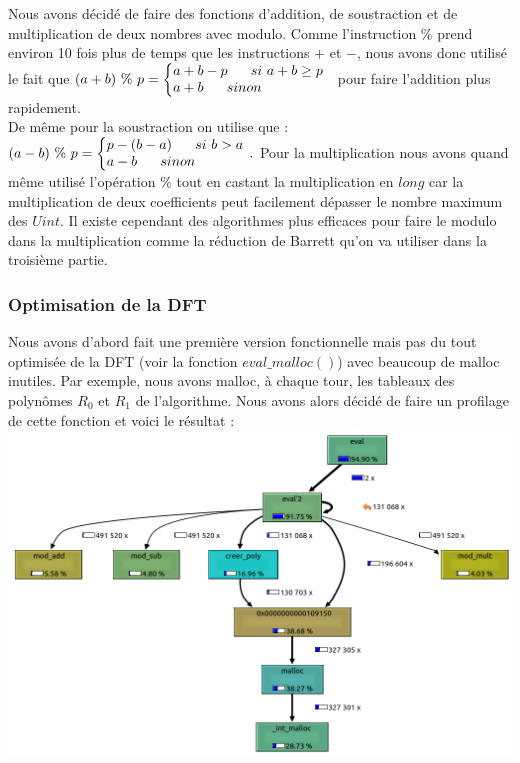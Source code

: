 \documentclass[12pt, a4paper]{article}
\begin{document}
Nous avons décidé de faire des fonctions d'addition, de soustraction et de multiplication de deux nombres avec modulo. Comme l'instruction $\%$ prend environ 10 fois plus de temps que les instructions $+$ et $-$, nous avons donc utilisé le fait que 
$ (a+b)\ \%\ p = 
\left\{\begin{array}{@{}l@{}}
a + b - p\ \ \ \ \ si\ a+b \geq p\\
a + b\ \ \ \ \ sinon
\end{array}\right.\,\ $ pour faire l'addition plus rapidement. \\
De même pour la soustraction on utilise que :
$ (a-b)\ \%\ p = 
\left\{\begin{array}{@{}l@{}}
p - (b - a)\ \ \ \ \ si\ b > a\\
a - b\ \ \ \ \ sinon
\end{array}\right.\,.$
Pour la multiplication nous avons quand même utilisé l'opération $\%$ tout en castant la multiplication en $long$ car la multiplication de deux coefficients peut facilement dépasser le nombre maximum des $Uint$. Il existe cependant des algorithmes plus efficaces pour faire le modulo dans la multiplication comme la réduction de Barrett qu'on va utiliser dans la troisième partie.

\subsubsection{Optimisation de la DFT}
Nous avons d'abord fait une première version fonctionnelle mais pas du tout optimisée de la DFT (voir la fonction $eval\_malloc()$) avec beaucoup de malloc inutiles. Par exemple, nous avons malloc, à chaque tour, les tableaux des polynômes $R_0$ et $R_1$ de l'algorithme. Nous avons alors décidé de faire un profilage de cette fonction et voici le résultat :
\includegraphics[scale=0.8]{profiler_eval_malloc}
\end{document}
